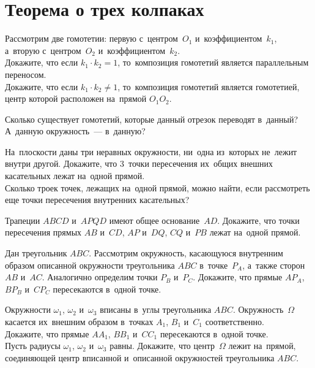 
\section*{Теорема о трех колпаках}


\begin{problems}

\item
Рассмотрим две гомотетии:
первую с~центром~$O_1$ и~коэффициентом~$k_1$, а~вторую с~центром~$O_2$
и~коэффициентом~$k_2$.
\\
\subproblem
Докажите, что если $k_1 \cdot k_2 = 1$, то~композиция гомотетий является
параллельным переносом.
\\
\subproblem
Докажите, что если $k_1 \cdot k_2 \neq 1$, то~композиция гомотетий является
гомотетией, центр которой расположен на~прямой $O_1 O_2$.

\item
Сколько существует гомотетий, которые данный отрезок переводят в~данный?
А~данную окружность~--- в~данную?

\item
\subproblem{}
На~плоскости даны три неравных окружности, ни~одна из~которых не~лежит внутри
другой.
Докажите, что 3~точки пересечения их~общих внешних касательных лежат на~одной
прямой.
\\
\subproblem
Сколько троек точек, лежащих на~одной прямой, можно найти, если
рассмотреть еще точки пересечения внутренних касательных?

\item
Трапеции $ABCD$ и~$APQD$ имеют общее основание~$AD$.
Докажите, что точки пересечения прямых $AB$ и~$CD$, $AP$ и~$DQ$, $CQ$ и~$PB$
лежат на~одной прямой.

\item
Дан треугольник $ABC$.
Рассмотрим окружность, касающуюся внутренним образом описанной окружности
треугольника $ABC$ в~точке~$P_A$, а~также сторон $AB$ и~$AC$.
Аналогично определим точки $P_B$ и~$P_C$.
Докажите, что прямые $A P_A$, $B P_B$ и~$C P_C$ пересекаются в~одной точке.

\item
Окружности $\omega_1$, $\omega_2$ и~$\omega_3$ вписаны в~углы
треугольника $ABC$.
Окружность~$\Omega$ касается их~внешним образом в~точках $A_1$, $B_1$ и~$C_1$
соответственно.
\\
\subproblem
Докажите, что прямые $A A_1$, $B B_1$ и~$C C_1$ пересекаются в~одной точке.
\\
\subproblem
Пусть радиусы $\omega_1$, $\omega_2$ и~$\omega_3$ равны.
Докажите, что центр~$\Omega$ лежит на~прямой, соединяющей центр вписанной
и~описанной окружностей треугольника $ABC$.


\end{problems}
